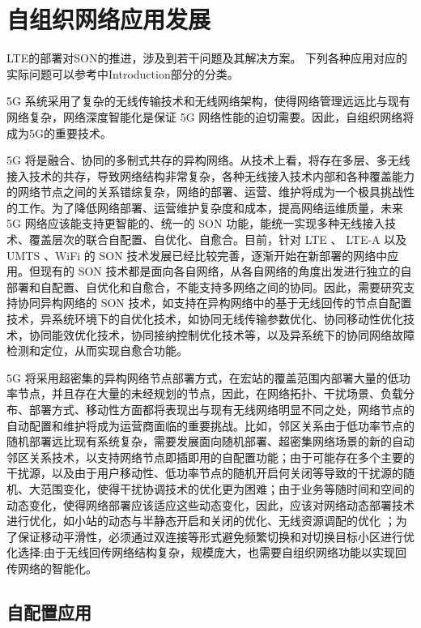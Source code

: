 ﻿\documentclass[11pt,draftclsnofoot,onecolumn,journal,letterpaper]{IEEEtran}
\begin{document}
\section{自组织网络应用发展}
\label{sec:SON}
LTE的部署对SON的推进，涉及到若干问题及其解决方案。
下列各种应用对应的实际问题可以参考\cite{Klaine2017}中Introduction部分的分类。

5G 系统采用了复杂的无线传输技术和无线网络架构，使得网络管理远远比与现有网络复杂，网络深度智能化是保证 5G 网络性能的迫切需要。因此，自组织网络将成为5G的重要技术。

5G 将是融合、协同的多制式共存的异构网络。从技术上看，将存在多层、多无线接入技术的共存，导致网络结构非常复杂，各种无线接入技术内部和各种覆盖能力的网络节点之间的关系错综复杂，网络的部署、运营、维护将成为一个极具挑战性的工作。为了降低网络部署、运营维护复杂度和成本，提高网络运维质量，未来 5G 网络应该能支持更智能的、统一的 SON 功能，能统一实现多种无线接入技术、覆盖层次的联合自配置、自优化、自愈合。目前，针对 LTE 、 LTE-A 以及 UMTS 、WiFi 的 SON 技术发展已经比较完善，逐渐开始在新部署的网络中应用。但现有的 SON 技术都是面向各自网络，从各自网络的角度出发进行独立的自部署和自配置、自优化和自愈合，不能支持多网络之间的协同。因此，需要研究支持协同异构网络的 SON 技术，如支持在异构网络中的基于无线回传的节点自配置技术，异系统环境下的自优化技术，如协同无线传输参数优化、协同移动性优化技术，协同能效优化技术，协同接纳控制优化技术等，以及异系统下的协同网络故障检测和定位，从而实现自愈合功能。

5G 将采用超密集的异构网络节点部署方式，在宏站的覆盖范围内部署大量的低功率节点，并且存在大量的未经规划的节点，因此，在网络拓扑、干扰场景、负载分布、部署方式、移动性方面都将表现出与现有无线网络明显不同之处，网络节点的自动配置和维护将成为运营商面临的重要挑战。比如，邻区关系由于低功率节点的随机部署远比现有系统复杂，需要发展面向随机部署、超密集网络场景的新的自动邻区关系技术，以支持网络节点即插即用的自配置功能；由于可能存在多个主要的干扰源，以及由于用户移动性、低功率节点的随机开启何关闭等导致的干扰源的随机、大范围变化，使得干扰协调技术的优化更为困难；由于业务等随时间和空间的动态变化，使得网络部署应该适应这些动态变化，因此，应该对网络动态部署技术进行优化，如小站的动态与半静态开启和关闭的优化、无线资源调配的优化 ；为了保证移动平滑性，必须通过双连接等形式避免频繁切换和对切换目标小区进行优化选择;由于无线回传网络结构复杂，规模庞大，也需要自组织网络功能以实现回传网络的智能化。


\subsection{自配置应用}
\label{sec:self-configuration}
\end{document}
